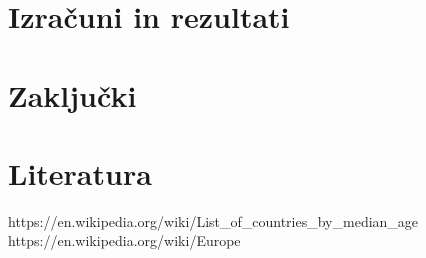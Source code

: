 \documentclass[a4paper,11pt]{article}
\begin{document}
\section{Izračuni in rezultati}

\section{Zaključki}
\section{Literatura}
https://en.wikipedia.org/wiki/List_of_countries_by_median_age
https://en.wikipedia.org/wiki/Europe
\end{document}
